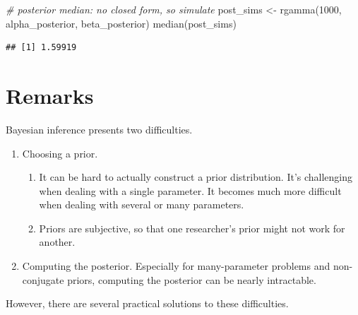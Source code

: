 \documentclass[
]{book}
\newenvironment{Shaded}{\begin{snugshade}}{\end{snugshade}}
\newcommand{\CommentTok}[1]{\textcolor[rgb]{0.56,0.35,0.01}{\textit{#1}}}
\newcommand{\DecValTok}[1]{\textcolor[rgb]{0.00,0.00,0.81}{#1}}
\newcommand{\FunctionTok}[1]{\textcolor[rgb]{0.00,0.00,0.00}{#1}}
\newcommand{\NormalTok}[1]{#1}
\newcommand{\OtherTok}[1]{\textcolor[rgb]{0.56,0.35,0.01}{#1}}
\providecommand{\tightlist}{%
  \setlength{\itemsep}{0pt}\setlength{\parskip}{0pt}}
\begin{document}
\begin{Shaded}
\begin{Highlighting}[]
\CommentTok{\# posterior median: no closed form, so simulate}
\NormalTok{post\_sims }\OtherTok{\textless{}{-}} \FunctionTok{rgamma}\NormalTok{(}\DecValTok{1000}\NormalTok{, alpha\_posterior, beta\_posterior)}
\FunctionTok{median}\NormalTok{(post\_sims)}
\end{Highlighting}
\end{Shaded}

\begin{verbatim}
## [1] 1.59919
\end{verbatim}

\hypertarget{remarks-1}{%
\section{Remarks}\label{remarks-1}}

Bayesian inference presents two difficulties.

\begin{enumerate}
\def\labelenumi{\arabic{enumi}.}
\tightlist
\item
  Choosing a prior.

  \begin{enumerate}
  \def\labelenumii{\alph{enumii}.}
  \tightlist
  \item
    It can be hard to actually construct a prior distribution. It's
    challenging when dealing with a single parameter. It becomes much
    more difficult when dealing with several or many parameters.
  \item
    Priors are subjective, so that one researcher's prior might not work
    for another.
  \end{enumerate}
\item
  Computing the posterior. Especially for many-parameter problems and
  non-conjugate priors, computing the posterior can be nearly
  intractable.
\end{enumerate}

However, there are several practical solutions to these difficulties.
\end{document}
